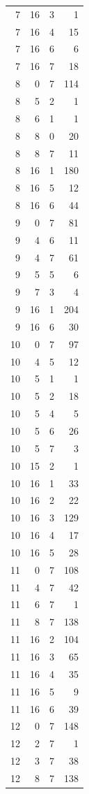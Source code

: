 \begin{longtable}{rrrr}
7 & 16 & 3 & 1\\
7 & 16 & 4 & 15\\
7 & 16 & 6 & 6\\
7 & 16 & 7 & 18\\
8 & 0 & 7 & 114\\
8 & 5 & 2 & 1\\
8 & 6 & 1 & 1\\
8 & 8 & 0 & 20\\
8 & 8 & 7 & 11\\
8 & 16 & 1 & 180\\
8 & 16 & 5 & 12\\
8 & 16 & 6 & 44\\
9 & 0 & 7 & 81\\
9 & 4 & 6 & 11\\
9 & 4 & 7 & 61\\
9 & 5 & 5 & 6\\
9 & 7 & 3 & 4\\
9 & 16 & 1 & 204\\
9 & 16 & 6 & 30\\
10 & 0 & 7 & 97\\
10 & 4 & 5 & 12\\
10 & 5 & 1 & 1\\
10 & 5 & 2 & 18\\
10 & 5 & 4 & 5\\
10 & 5 & 6 & 26\\
10 & 5 & 7 & 3\\
10 & 15 & 2 & 1\\
10 & 16 & 1 & 33\\
10 & 16 & 2 & 22\\
10 & 16 & 3 & 129\\
10 & 16 & 4 & 17\\
10 & 16 & 5 & 28\\
11 & 0 & 7 & 108\\
11 & 4 & 7 & 42\\
11 & 6 & 7 & 1\\
11 & 8 & 7 & 138\\
11 & 16 & 2 & 104\\
11 & 16 & 3 & 65\\
11 & 16 & 4 & 35\\
11 & 16 & 5 & 9\\
11 & 16 & 6 & 39\\
12 & 0 & 7 & 148\\
12 & 2 & 7 & 1\\
12 & 3 & 7 & 38\\
12 & 8 & 7 & 138\\

\end{longtable}
